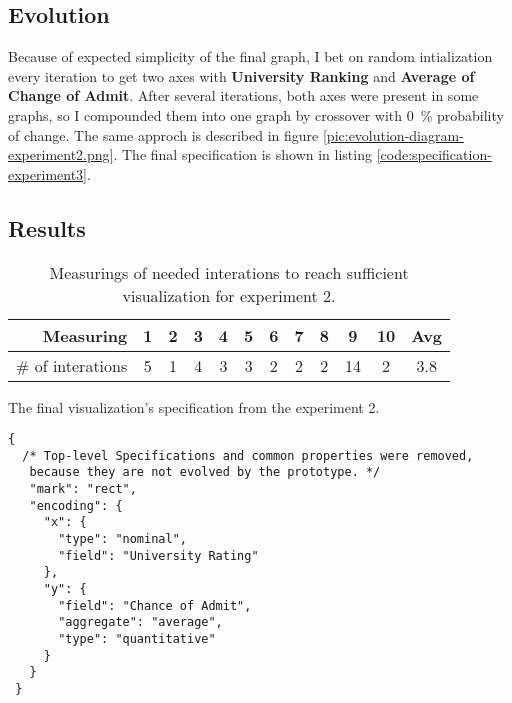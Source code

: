 \subsection{Evolution}
Because of expected simplicity of the final graph, I bet on random intialization every iteration to get two axes with \textbf{University Ranking} and \textbf{Average of Change of Admit}. After several iterations, both axes were present in some graphs, so I compounded them into one graph by crossover with 0~\% probability of change. The same approch is described in figure \ref{pic:evolution-diagram-experiment2.png}. The final specification is shown in listing \ref{code:specification-experiment3}.


\subsection{Results}\begin{table}[htbp]
      \centering
      \caption{Measurings of needed interations to reach sufficient visualization for experiment 2.}
      \label{table:results}
          \begin{tabular}{ r | c c c c c c c c c c | c }
          \hline
              \textbf{Measuring} & \textbf{1} & \textbf{2} & \textbf{3} & \textbf{4} & \textbf{5} & \textbf{6} & \textbf{7} & \textbf{8} & \textbf{9} & \textbf{10} & \textbf{Avg} \\
          \toprule
\hline \# of interations  & 5 & 1 & 4 & 3 & 3 & 2 & 2 & 2 & 14 & 2 & 3.8 \\ \hline
          \end{tabular}
\end{table}

\begin{listing}[htbp]
\caption{\label{code:specification-experiment3}The final visualization's specification from the experiment 2.}
\begin{verbatim}
{
  /* Top-level Specifications and common properties were removed,
   because they are not evolved by the prototype. */
   "mark": "rect",
   "encoding": {
     "x": {
       "type": "nominal",
       "field": "University Rating"
     },
     "y": {
       "field": "Chance of Admit",
       "aggregate": "average",
       "type": "quantitative"
     }
   }
 }
\end{verbatim}
\end{listing}


